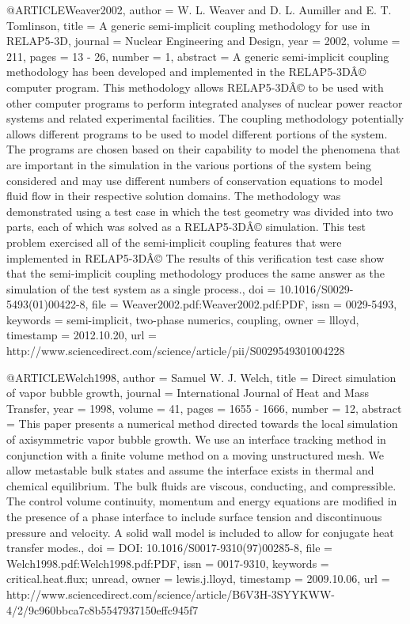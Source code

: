 {{@ARTICLE{Weaver2002,
  author = {W. L. Weaver and D. L. Aumiller and E. T. Tomlinson},
  title = {A generic semi-implicit coupling methodology for use in {RELAP5-3D}},
  journal = {Nuclear Engineering and Design},
  year = {2002},
  volume = {211},
  pages = {13 - 26},
  number = {1},
  abstract = {A generic semi-implicit coupling methodology has been developed and
	implemented in the RELAP5-3DÂ© computer program. This methodology
	allows RELAP5-3DÂ© to be used with other computer programs to perform
	integrated analyses of nuclear power reactor systems and related
	experimental facilities. The coupling methodology potentially allows
	different programs to be used to model different portions of the
	system. The programs are chosen based on their capability to model
	the phenomena that are important in the simulation in the various
	portions of the system being considered and may use different numbers
	of conservation equations to model fluid flow in their respective
	solution domains. The methodology was demonstrated using a test case
	in which the test geometry was divided into two parts, each of which
	was solved as a RELAP5-3DÂ© simulation. This test problem exercised
	all of the semi-implicit coupling features that were implemented
	in RELAP5-3DÂ© The results of this verification test case show that
	the semi-implicit coupling methodology produces the same answer as
	the simulation of the test system as a single process.},
  doi = {10.1016/S0029-5493(01)00422-8},
  file = {Weaver2002.pdf:Weaver2002.pdf:PDF},
  issn = {0029-5493},
  keywords = {semi-implicit, two-phase numerics, coupling},
  owner = {llloyd},
  timestamp = {2012.10.20},
  url = {http://www.sciencedirect.com/science/article/pii/S0029549301004228}
}

@ARTICLE{Welch1998,
  author = {Samuel W. J. Welch},
  title = {Direct simulation of vapor bubble growth},
  journal = {International Journal of Heat and Mass Transfer},
  year = {1998},
  volume = {41},
  pages = {1655 - 1666},
  number = {12},
  abstract = {This paper presents a numerical method directed towards the local
	simulation of axisymmetric vapor bubble growth. We use an interface
	tracking method in conjunction with a finite volume method on a moving
	unstructured mesh. We allow metastable bulk states and assume the
	interface exists in thermal and chemical equilibrium. The bulk fluids
	are viscous, conducting, and compressible. The control volume continuity,
	momentum and energy equations are modified in the presence of a phase
	interface to include surface tension and discontinuous pressure and
	velocity. A solid wall model is included to allow for conjugate heat
	transfer modes.},
  doi = {DOI: 10.1016/S0017-9310(97)00285-8},
  file = {Welch1998.pdf:Welch1998.pdf:PDF},
  issn = {0017-9310},
  keywords = {critical.heat.flux; unread},
  owner = {lewis.j.lloyd},
  timestamp = {2009.10.06},
  url = {http://www.sciencedirect.com/science/article/B6V3H-3SYYKWW-4/2/9c960bbca7c8b5547937150effc945f7}
}

}}
